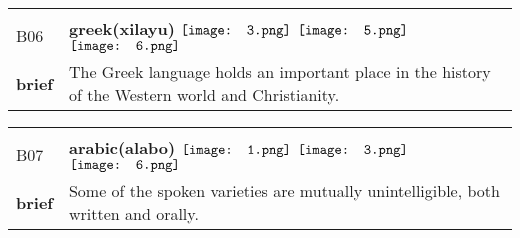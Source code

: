 \documentclass[UTF8]{article}
\begin{document}
            \begin{tabularx}{\textwidth}{p{1.5cm}X}
            \arrayrulecolor{myBlue}
        	\hline\\
            \small{B06}&
            \large{\bfseries{greek(xilayu)}}\hfill
                                                            \phantom{$\vcenter{\hbox{\texttt{[image: 1.png]}}}$}
                                                                \phantom{$\vcenter{\hbox{\texttt{[image: 2.png]}}}$}
                                                                $\vcenter{\hbox{\texttt{[image: 3.png]}}}$
                                                                \phantom{$\vcenter{\hbox{\texttt{[image: 4.png]}}}$}
                                                                $\vcenter{\hbox{\texttt{[image: 5.png]}}}$
                                                                $\vcenter{\hbox{\texttt{[image: 6.png]}}}$
                                                                \phantom{$\vcenter{\hbox{\texttt{[image: 7.png]}}}$}
                                        \\[10pt]
            \large{\bfseries{brief}}&\noindent\parbox[c]{\hsize}{The Greek language holds an important place in the history of the Western world and Christianity.} \\[5pt]
            \hline\\[-10pt]
        \end{tabularx}
            \begin{tabularx}{\textwidth}{p{1.5cm}X}
            \arrayrulecolor{myBlue}
        	\hline\\
            \small{B07}&
            \large{\bfseries{arabic(alabo)}}\hfill
                                                            $\vcenter{\hbox{\texttt{[image: 1.png]}}}$
                                                                \phantom{$\vcenter{\hbox{\texttt{[image: 2.png]}}}$}
                                                                $\vcenter{\hbox{\texttt{[image: 3.png]}}}$
                                                                \phantom{$\vcenter{\hbox{\texttt{[image: 4.png]}}}$}
                                                                \phantom{$\vcenter{\hbox{\texttt{[image: 5.png]}}}$}
                                                                $\vcenter{\hbox{\texttt{[image: 6.png]}}}$
                                                                \phantom{$\vcenter{\hbox{\texttt{[image: 7.png]}}}$}
                                        \\[10pt]
            \large{\bfseries{brief}}&\noindent\parbox[c]{\hsize}{Some of the spoken varieties are mutually unintelligible, both written and orally.} \\[5pt]
            \hline\\[-10pt]
        \end{tabularx}
\end{document}
